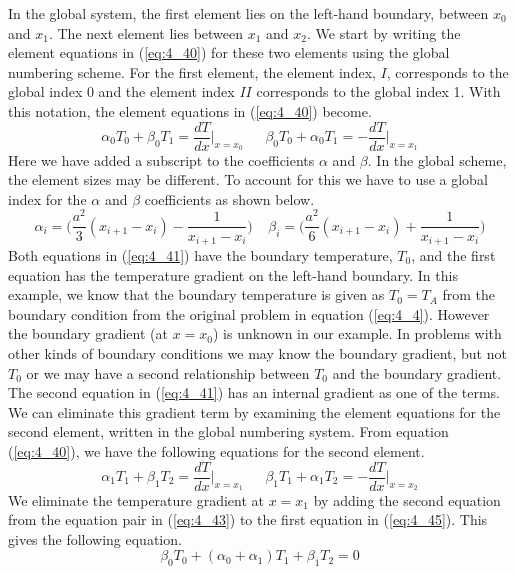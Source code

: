 \documentclass[12pt]{report}
\newcommand{\refn}[1]{(\ref{#1})}
\newcommand{\refx}[1]{\refn{eq:#1}}
\newcommand{\NI}{\noindent}
\begin{document}
	\NI In the global system, the first element lies on the left-hand boundary, between $x_0$ and $x_1$. The next element lies between $x_1$ and $x_2$. We start by writing the element equations in \refx{4_40} for these two elements using the global numbering scheme. For the first element, the element
	index, $I$, corresponds to the global index 0 and the element index $II$ corresponds to the global index 1. With this notation, the element equations in \refx{4_40} become.
	\begin{equation}
		\alpha_0 T_0 + \beta_0 T_{1} = \frac{dT}{dx}\Biggl|_{x=x_0} ~~~~~~~\beta_0 T_0 + \alpha_0 T_{1} =- \frac{dT}{dx}\Biggl|_{x=x_{1}} \label{eq:4_41}
	\end{equation}
	Here we have added a subscript to the coefficients $\alpha$ and $\beta$. In the global scheme, the element sizes may be different. To account for this we have to use a global index for the $\alpha$ and $\beta$ coefficients as shown below.
	\begin{equation}
		\alpha_i = \Biggl(\frac{a^2}{3}(x_{i+1}-x_i)-\frac{1}{x_{i+1} - x_i}\Biggr)~~~~~ \beta_i = \Biggl(\frac{a^2}{6}(x_{i+1}-x_i)+\frac{1}{x_{i+1} - x_i}\Biggr) \label{eq:4_42}
	\end{equation}
	Both equations in \refx{4_41} have the boundary temperature, $T_0$, and the first equation has the temperature gradient on the left-hand boundary. In this example, we know that the boundary temperature is given as $T_0 = T_A$ from the boundary condition from the original problem in equation \refx{4_4}. However the boundary gradient (at $x = x_0$) is unknown in our example. In problems with other kinds of boundary conditions we may know the boundary gradient, but not $T_0$ or we may have a second relationship between $T_0$ and the boundary gradient.\\
	
	\NI The second equation in \refx{4_41} has an internal gradient as one of the terms. We can eliminate this gradient term by examining the element equations for the second element, written in the global numbering system. From equation \refx{4_40}, we have the following equations for the second element.
	\begin{equation}
		\alpha_1 T_1 + \beta_1 T_{2} = \frac{dT}{dx}\Biggl|_{x=x_1} ~~~~~~~\beta_1 T_1 + \alpha_1 T_{2} =- \frac{dT}{dx}\Biggl|_{x=x_{2}} \label{eq:4_43}
	\end{equation}
	We eliminate the temperature gradient at $x = x_1$ by adding the second equation from the equation pair in \refx{4_43} to the first equation in \refx{4_45}. This gives the following equation.
	\begin{equation}
		\beta_0T_0 + (\alpha_0 + \alpha_1)T_1 + \beta_1T_2 = 0 \label{eq:4_44}
	\end{equation}
	\newpage
\end{document}
